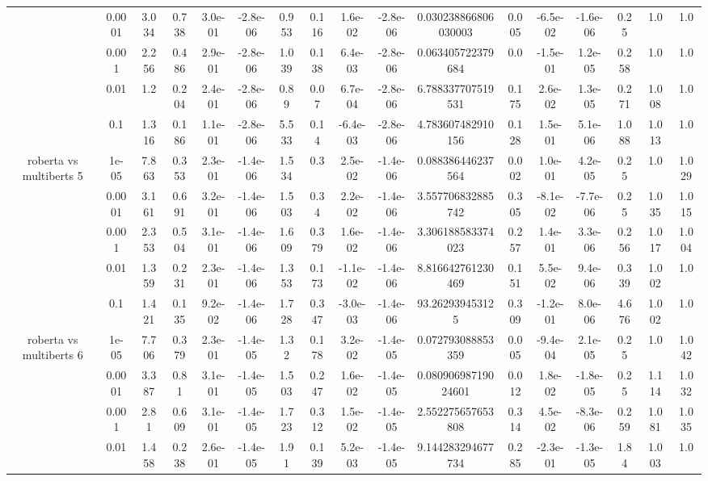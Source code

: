 \begin{tabular}{|c|c|c|c|c|c|c|c|c|c|c|c|c|c|c|c|c|}
 & 0.0001 & 3.034 & 0.738 & 3.0e-01 & -2.8e-06 & 0.953 & 0.116 & 1.6e-02 & -2.8e-06 & 0.030238866806030003 & 0.005 & -6.5e-02 & -1.6e-06 & 0.25 & 1.0 & 1.0 \\
 & 0.001 & 2.256 & 0.486 & 2.9e-01 & -2.8e-06 & 1.039 & 0.138 & 6.4e-03 & -2.8e-06 & 0.063405722379684 & 0.0 & -1.5e-01 & 1.2e-05 & 0.258 & 1.0 & 1.0 \\
 & 0.01 & 1.2 & 0.204 & 2.4e-01 & -2.8e-06 & 0.89 & 0.07 & 6.7e-04 & -2.8e-06 & 6.788337707519531 & 0.175 & 2.6e-02 & 1.3e-05 & 0.271 & 1.008 & 1.0 \\
 & 0.1 & 1.316 & 0.186 & 1.1e-01 & -2.8e-06 & 5.533 & 0.14 & -6.4e-03 & -2.8e-06 & 4.783607482910156 & 0.128 & 1.5e-01 & 5.1e-06 & 1.088 & 1.013 & 1.0 \\
\hline
\multirow{5}{*}{roberta  vs multiberts 5} & 1e-05 & 7.863 & 0.353 & 2.3e-01 & -1.4e-06 & 1.534 & 0.3 & 2.5e-02 & -1.4e-06 & 0.088386446237564 & 0.002 & 1.0e-01 & 4.2e-05 & 0.25 & 1.0 & 1.029 \\
 & 0.0001 & 3.161 & 0.691 & 3.2e-01 & -1.4e-06 & 1.503 & 0.34 & 2.2e-02 & -1.4e-06 & 3.557706832885742 & 0.305 & -8.1e-02 & -7.7e-06 & 0.25 & 1.035 & 1.015 \\
 & 0.001 & 2.353 & 0.504 & 3.1e-01 & -1.4e-06 & 1.609 & 0.379 & 1.6e-02 & -1.4e-06 & 3.306188583374023 & 0.257 & 1.4e-01 & 3.3e-06 & 0.256 & 1.017 & 1.004 \\
 & 0.01 & 1.359 & 0.231 & 2.3e-01 & -1.4e-06 & 1.353 & 0.173 & -1.1e-02 & -1.4e-06 & 8.816642761230469 & 0.151 & 5.5e-02 & 9.4e-06 & 0.339 & 1.002 & 1.0 \\
 & 0.1 & 1.421 & 0.135 & 9.2e-02 & -1.4e-06 & 1.728 & 0.347 & -3.0e-03 & -1.4e-06 & 93.262939453125 & 0.309 & -1.2e-01 & 8.0e-06 & 4.676 & 1.002 & 1.0 \\
\hline
\multirow{5}{*}{roberta  vs multiberts 6} & 1e-05 & 7.706 & 0.379 & 2.3e-01 & -1.4e-05 & 1.32 & 0.178 & 3.2e-02 & -1.4e-05 & 0.072793088853359 & 0.005 & -9.4e-04 & 2.1e-05 & 0.25 & 1.0 & 1.042 \\
 & 0.0001 & 3.387 & 0.81 & 3.1e-01 & -1.4e-05 & 1.503 & 0.247 & 1.6e-02 & -1.4e-05 & 0.08090698719024601 & 0.012 & 1.8e-02 & -1.8e-05 & 0.25 & 1.114 & 1.032 \\
 & 0.001 & 2.81 & 0.609 & 3.1e-01 & -1.4e-05 & 1.723 & 0.312 & 1.5e-02 & -1.4e-05 & 2.552275657653808 & 0.314 & 4.5e-02 & -8.3e-06 & 0.259 & 1.081 & 1.035 \\
 & 0.01 & 1.458 & 0.238 & 2.6e-01 & -1.4e-05 & 1.91 & 0.139 & 5.2e-03 & -1.4e-05 & 9.144283294677734 & 0.285 & -2.3e-01 & -1.3e-05 & 1.84 & 1.003 & 1.0 \\

\end{tabular}
